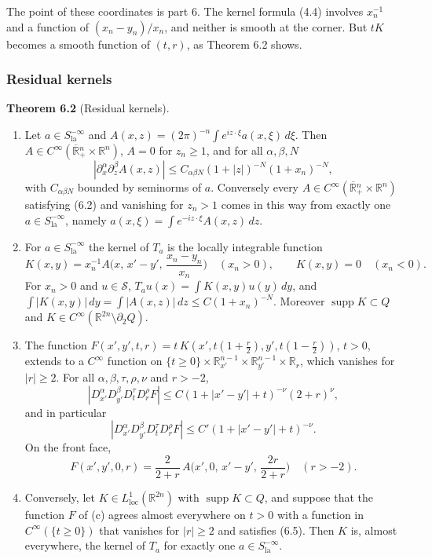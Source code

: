 \documentclass[
  11pt,
]{article}
\begin{document}
The point of these coordinates is part 6. The kernel formula (4.4)
involves \(x_n^{-1}\) and a function of \((x_n-y_n)/x_n\), and neither
is smooth at the corner. But \(tK\) becomes a smooth function of
\((t,r)\), as Theorem 6.2 shows.

\subsubsection{Residual kernels}\label{residual-kernels}

\textbf{Theorem 6.2} (Residual kernels).

\begin{enumerate}
\def\labelenumi{(\alph{enumi})}
\item
  Let \(a\in S^{-\infty}_{\mathrm{la}}\) and
  \(A(x,z)=(2\pi)^{-n}\int e^{iz\cdot\xi}a(x,\xi)\,d\xi\). Then
  \(A\in C^\infty(\overline{\mathbb R}{}^n_+\times\mathbb R^n)\),
  \(A=0\) for \(z_n\geq1\), and for all \(\alpha,\beta,N\) \[
|\partial_x^\alpha\partial_z^\beta A(x,z)|\leq C_{\alpha\beta N}(1+|z|)^{-N}(1+x_n)^{-N},
\tag{6.2}
\] with \(C_{\alpha\beta N}\) bounded by seminorms of \(a\).
  Conversely every
  \(A\in C^\infty(\overline{\mathbb R}{}^n_+\times\mathbb R^n)\)
  satisfying (6.2) and vanishing for \(z_n>1\) comes in this way from
  exactly one \(a\in S^{-\infty}_{\mathrm{la}}\), namely
  \(a(x,\xi)=\int e^{-iz\cdot\xi}A(x,z)\,dz\).
\item
  For \(a\in S^{-\infty}_{\mathrm{la}}\) the kernel of \(T_a\) is the
  locally integrable function \[
K(x,y)=x_n^{-1}A\Big(x,\,x'-y',\,\frac{x_n-y_n}{x_n}\Big)\quad(x_n>0),\qquad K(x,y)=0\quad(x_n<0).
\tag{6.3}
\] For \(x_n>0\) and \(u\in\mathcal S\),
  \(T_au(x)=\int K(x,y)u(y)\,dy\), and
  \(\int|K(x,y)|\,dy=\int|A(x,z)|\,dz\leq C(1+x_n)^{-N}\). Moreover
  \(\operatorname{supp}K\subset Q\) and
  \(K\in C^\infty(\mathbb R^{2n}\setminus\partial_2Q)\).
\item
  The function
  \(F(x',y',t,r)=t\,K(x',t(1+\tfrac r2),y',t(1-\tfrac r2))\), \(t>0\),
  extends to a \(C^\infty\) function on
  \(\{t\geq0\}\times\mathbb R^{n-1}_{x'}\times\mathbb R^{n-1}_{y'}\times\mathbb R_r\),
  which vanishes for \(|r|\geq2\). For all
  \(\alpha,\beta,\tau,\rho,\nu\) and \(r>-2\), \[
|D^\alpha_{x'}D^\beta_{y'}D^\tau_tD^\rho_rF|\leq C(1+|x'-y'|+t)^{-\nu}(2+r)^{\nu},
\tag{6.4}
\] and in particular \[
|D^\alpha_{x'}D^\beta_{y'}D^\tau_tD^\rho_rF|\leq C'(1+|x'-y'|+t)^{-\nu}.
\tag{6.5}
\] On the front face, \[
F(x',y',0,r)=\frac{2}{2+r}\,A\Big(x',0,\,x'-y',\,\frac{2r}{2+r}\Big)\quad(r>-2).
\tag{6.6}
\]
\item
  Conversely, let \(K\in L^1_{\mathrm{loc}}(\mathbb R^{2n})\) with
  \(\operatorname{supp}K\subset Q\), and suppose that the function \(F\)
  of (c) agrees almost everywhere on \(t>0\) with a function in
  \(C^\infty(\{t\geq0\})\) that vanishes for \(|r|\geq2\) and satisfies
  (6.5). Then \(K\) is, almost everywhere, the kernel of \(T_a\) for
  exactly one \(a\in S^{-\infty}_{\mathrm{la}}\).
\end{enumerate}
\end{document}
